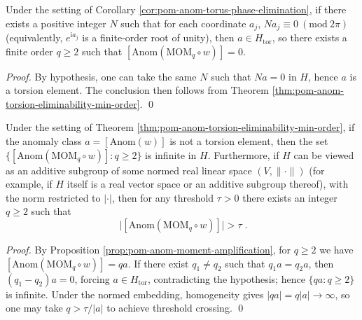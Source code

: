 \begin{corollary}\label{cor:pom-anom-cyclotomic-phase-torsion}
Under the setting of Corollary \ref{cor:pom-anom-torus-phase-elimination}, if there exists a positive integer \(N\) such that for each coordinate \(a_j\), \(N a_j\equiv 0\ (\mathrm{mod}\ 2\pi)\) (equivalently, \(e^{\mathrm{i}a_j}\) is a finite-order root of unity), then \(a\in H_{\mathrm{tor}}\), so there exists a finite order \(q\ge 2\) such that \([\mathrm{Anom}(\mathrm{MOM}_q\circ w)]=0\).
\end{corollary}
\begin{proof}
By hypothesis, one can take the same \(N\) such that \(Na=0\) in \(H\), hence \(a\) is a torsion element.
The conclusion then follows from Theorem \ref{thm:pom-anom-torsion-eliminability-min-order}. \qed
\end{proof}

\begin{corollary}\label{cor:pom-anom-unbounded-amplification}
Under the setting of Theorem \ref{thm:pom-anom-torsion-eliminability-min-order}, if the anomaly class \(a=[\mathrm{Anom}(w)]\) is not a torsion element, then the set
\(
\{[\mathrm{Anom}(\mathrm{MOM}_q\circ w)]:q\ge 2\}
\)
is infinite in \(H\).
Furthermore, if \(H\) can be viewed as an additive subgroup of some normed real linear space \((V,\|\cdot\|)\) (for example, if \(H\) itself is a real vector space or an additive subgroup thereof), with the norm restricted to \(|\cdot|\), then for any threshold \(\tau>0\) there exists an integer \(q\ge 2\) such that
\[
\boxed{\;
\bigl|[\mathrm{Anom}(\mathrm{MOM}_q\circ w)]\bigr|>\tau\; }.
\]
\end{corollary}
\begin{proof}
By Proposition \ref{prop:pom-anom-moment-amplification}, for \(q\ge 2\) we have
\(
[\mathrm{Anom}(\mathrm{MOM}_q\circ w)]=qa
\).
If there exist \(q_1\neq q_2\) such that \(q_1a=q_2a\), then \((q_1-q_2)a=0\), forcing \(a\in H_{\mathrm{tor}}\), contradicting the hypothesis; hence \(\{qa:q\ge 2\}\) is infinite.
Under the normed embedding, homogeneity gives \(|qa|=q|a|\to\infty\), so one may take \(q>\tau/|a|\) to achieve threshold crossing. \qed
\end{proof}

